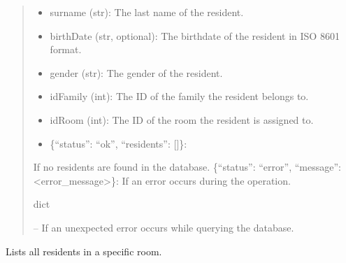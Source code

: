 \documentclass[letterpaper,10pt,english]{sphinxmanual}
\begin{document}
\begin{fulllineitems}
\begin{fulllineitems}
\begin{quote}
\begin{description}
\begin{description}
\begin{description}
\begin{itemize}
\item {} 
\sphinxAtStartPar
surname (str): The last name of the resident.

\item {} 
\sphinxAtStartPar
birthDate (str, optional): The birthdate of the resident in ISO 8601 format.

\item {} 
\sphinxAtStartPar
gender (str): The gender of the resident.

\item {} 
\sphinxAtStartPar
idFamily (int): The ID of the family the resident belongs to.

\item {} 
\sphinxAtStartPar
idRoom (int): The ID of the room the resident is assigned to.

\end{itemize}

\end{description}
\begin{itemize}
\item {} 
\sphinxAtStartPar
\{“status”: “ok”, “residents”: {[}{]}\}:

\end{itemize}

\sphinxAtStartPar
If no residents are found in the database.
\sphinxhyphen{} \{“status”: “error”, “message”: <error\_message>\}:
If an error occurs during the operation.

\end{description}


\sphinxAtStartPar
dict

\sphinxAtStartPar
{} – If an unexpected error occurs while querying the database.

\end{description}\end{quote}

\end{fulllineitems}


\begin{fulllineitems}
\label{\detokenize{app.controllers:app.controllers.resident_controller.ResidentController.list_residents_in_room}}
\pysigstartsignatures
\pysiglinewithargsret
{}
{\sphinxparamcomma {}}
{}
\pysigstopsignatures
\sphinxAtStartPar
Lists all residents in a specific room.


\end{fulllineitems}
\end{fulllineitems}
\end{document}
